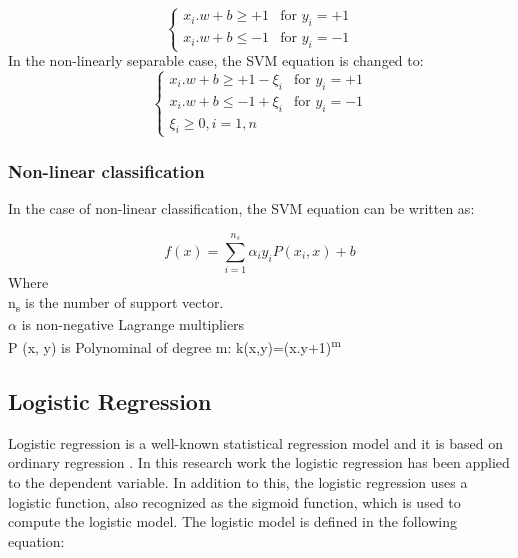 \documentclass[review]{elsarticle}
\begin{document}
 		\begin{equation}
 		\left\{ \begin{array}{rcl}
 		x_i . w + b \geq +1 & \mbox{for } 
 		y_i = +1 \\ x_i . w + b \leq -1 & \mbox{for }	y_i = -1
 		
 		\end{array}\right.
 		\label{eq:Linear}
 		\end{equation}
 		In the non-linearly separable case, the SVM equation is changed to: 
 		\begin{equation}
 		\left\{ \begin{array}{rcl}
 		x_i . w + b \geq +1 - \xi_i & \mbox{for } 
 		y_i = +1 \\ x_i . w + b \leq -1 +\xi_i & \mbox{for }	y_i = -1 \\ \xi_i \geq 0, i=1, n
 		
 		\end{array}\right.
 		\label{eq:nonLinear}
 		\end{equation}
 		
 		\subsubsection{Non-linear classification}
		
 		In the case of non-linear classification, the SVM equation can be written as:
		
 		\begin{equation}
 		f(x) = \sum_{i=1}^{n_s} \alpha_i y_i P(x_i,x) +b
 		\label{eq:sum_nonLinear}
 		\end{equation}
 		Where \\
 		n\textsubscript{s} is the number of support vector. \\
 		$\alpha$  is non-negative Lagrange multipliers\\
 		P (x, y) is Polynominal of degree m: k(x,y)=(x.y+1)\textsuperscript{m}
		
\subsection{Logistic Regression}
\label{subsec:Logistic}
Logistic regression is a well-known statistical regression model and it is based on ordinary regression \cite{Wilson2015}. In this research work the logistic regression has been applied to the dependent variable. In addition to this, the logistic regression uses a logistic function, also recognized as the sigmoid function, which is used to compute the logistic model. The logistic model is defined in the following equation:
	
\end{document}
